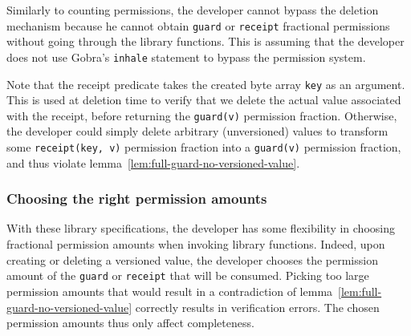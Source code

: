 Similarly to counting permissions, the developer cannot bypass the deletion mechanism because he cannot obtain \texttt{guard} or \texttt{receipt} fractional permissions without going through the library functions.
This is assuming that the developer does not use Gobra's \texttt{inhale} statement to bypass the permission system.

Note that the receipt predicate takes the created byte array \texttt{key} as an argument.
This is used at deletion time to verify that we delete the actual value associated with the receipt, before returning the \texttt{guard(v)} permission fraction. Otherwise, the developer could simply delete arbitrary (unversioned) values to transform some \texttt{receipt(key, v)} permission fraction into a \texttt{guard(v)} permission fraction, and thus violate lemma~\ref{lem:full-guard-no-versioned-value}. %




\subsubsection{Choosing the right permission amounts}
\label{sec:choosing-the-right-permission-amounts}

With these library specifications, the developer has some flexibility in choosing fractional permission amounts when invoking library functions.
Indeed, upon creating or deleting a versioned value, the developer chooses the permission amount of the \texttt{guard} or \texttt{receipt} that will be consumed.
Picking too large permission amounts that would result in a contradiction of lemma~\ref{lem:full-guard-no-versioned-value} correctly results in verification errors.
The chosen permission amounts thus only affect completeness.

